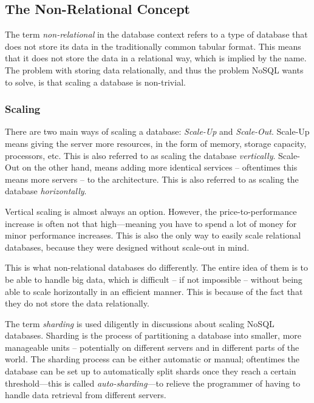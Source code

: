 
\subsection{The Non-Relational Concept}
\label{intro-nosql-concept}
The term \emph{non-relational} in the database context refers to a type of
database that does not store its data in the traditionally common tabular
format. This means that it does not store the data in a relational way, which
is implied by the name. The problem with storing data relationally, and thus
the problem NoSQL wants to solve, is that scaling a database is non-trivial.

\subsubsection{Scaling}
\label{intro-scaling}
There are two main ways of scaling a database: \emph{Scale-Up} and
\emph{Scale-Out}. Scale-Up means giving the server more resources, in the form
of memory, storage capacity, processors, etc. This is also referred to as
scaling the database \emph{vertically}. Scale-Out on the other hand, means
adding more identical services -- oftentimes this means more servers -- to the
architecture. This is also referred to as scaling the database
\emph{horizontally}.

Vertical scaling is almost always an option. However, the price-to-performance
increase is often not that high---meaning you have to spend a lot of money for
minor performance increases. This is also the only way to easily scale
relational databases, because they were designed without scale-out in mind.

This is what non-relational databases do differently. The entire idea of them
is to be able to handle big data, which is difficult -- if not impossible --
without being able to scale horizontally in an efficient manner. This is because
of the fact that they do not store the data relationally.

The term \emph{sharding} is used diligently in discussions about scaling NoSQL
databases. Sharding is the process of partitioning a database into smaller, more
manageable units -- potentially on different servers and in different parts of
the world. The sharding process can be either automatic or manual; oftentimes
the database can be set up to automatically split shards once they reach a
certain threshold---this is called \emph{auto-sharding}---to relieve the
programmer of having to handle data retrieval from different servers.

